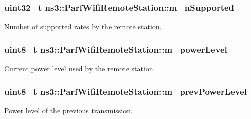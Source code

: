 \subsubsection[{\texorpdfstring{m\+\_\+n\+Supported}{m_nSupported}}]{\setlength{\rightskip}{0pt plus 5cm}uint32\+\_\+t ns3\+::\+Parf\+Wifi\+Remote\+Station\+::m\+\_\+n\+Supported}\hypertarget{structns3_1_1ParfWifiRemoteStation_abd1384023d6df405c71d1143833b3697}{}\label{structns3_1_1ParfWifiRemoteStation_abd1384023d6df405c71d1143833b3697}


Number of supported rates by the remote station. 

\subsubsection[{\texorpdfstring{m\+\_\+power\+Level}{m_powerLevel}}]{\setlength{\rightskip}{0pt plus 5cm}uint8\+\_\+t ns3\+::\+Parf\+Wifi\+Remote\+Station\+::m\+\_\+power\+Level}\hypertarget{structns3_1_1ParfWifiRemoteStation_aa8e8e7d3461c4d6003f9bec8a89fe9a4}{}\label{structns3_1_1ParfWifiRemoteStation_aa8e8e7d3461c4d6003f9bec8a89fe9a4}


Current power level used by the remote station. 

\subsubsection[{\texorpdfstring{m\+\_\+prev\+Power\+Level}{m_prevPowerLevel}}]{\setlength{\rightskip}{0pt plus 5cm}uint8\+\_\+t ns3\+::\+Parf\+Wifi\+Remote\+Station\+::m\+\_\+prev\+Power\+Level}\hypertarget{structns3_1_1ParfWifiRemoteStation_ac3bb9d05111a5dee5b94fbc2ecade020}{}\label{structns3_1_1ParfWifiRemoteStation_ac3bb9d05111a5dee5b94fbc2ecade020}


Power level of the previous transmission. 

